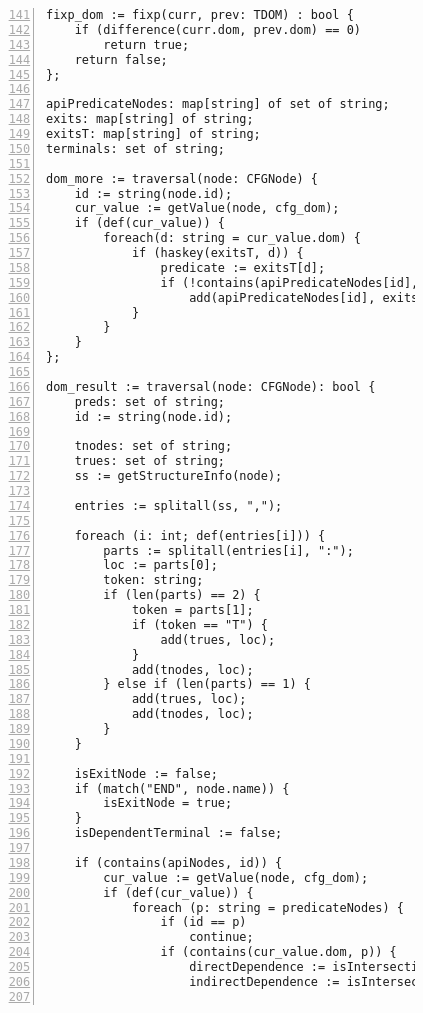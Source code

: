 \begin{figure}[ht!]
\begin{lstlisting}[numbers=left, tabsize=4, escapechar=@, caption={API Usage Mining Analysis},label={lst:aun-code},  firstline = 141, firstnumber = 141, lastline = 201]
fixp_dom := fixp(curr, prev: TDOM) : bool {
 	if (difference(curr.dom, prev.dom) == 0)
 		return true;	
 	return false;
};

apiPredicateNodes: map[string] of set of string;
exits: map[string] of string;
exitsT: map[string] of string;
terminals: set of string;

dom_more := traversal(node: CFGNode) {
    id := string(node.id);
    cur_value := getValue(node, cfg_dom);
    if (def(cur_value)) {
        foreach(d: string = cur_value.dom) {
            if (haskey(exitsT, d)) {
                predicate := exitsT[d];  
                if (!contains(apiPredicateNodes[id], predicate))
                    add(apiPredicateNodes[id], exits[d]);
            }
        }
    }
};

dom_result := traversal(node: CFGNode): bool {
    preds: set of string;
    id := string(node.id);
    
    tnodes: set of string;
    trues: set of string;
    ss := getStructureInfo(node);
    
    entries := splitall(ss, ",");
    
    foreach (i: int; def(entries[i])) {
    	parts := splitall(entries[i], ":"); 
    	loc := parts[0]; 
    	token: string;
    	if (len(parts) == 2) {
    	    token = parts[1];
    		if (token == "T") {
    		    add(trues, loc);    
    		}
            add(tnodes, loc);
    	} else if (len(parts) == 1) {
    	    add(trues, loc);  
    		add(tnodes, loc);
    	}
    }
    
    isExitNode := false;
    if (match("END", node.name)) {
        isExitNode = true;
    }
    isDependentTerminal := false;

    if (contains(apiNodes, id)) {
        cur_value := getValue(node, cfg_dom);
        if (def(cur_value)) {
            foreach (p: string = predicateNodes) {
                if (id == p)
                    continue;
                if (contains(cur_value.dom, p)) {
                    directDependence := isIntersectionNotNull(variables[id], variables[p]);
                    indirectDependence := isIntersectionNotNull(allVars, variables[p]);
                    

\end{lstlisting}
\end{figure}

